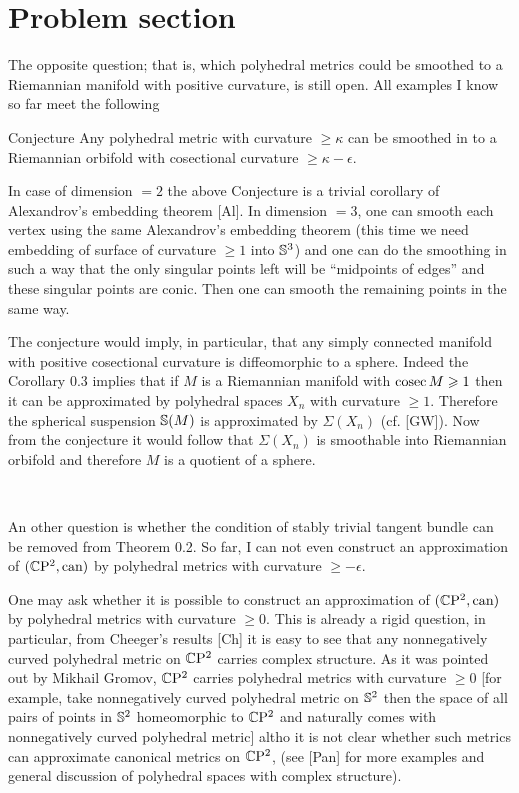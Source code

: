 \documentclass{article}
\begin{document}
\section{Problem section}


The opposite question;
that is, which polyhedral metrics
could be smoothed to a Riemannian manifold with positive curvature,
is still open. All examples I know so far meet the following


\begin{thm}{Conjecture} Any polyhedral metric with curvature $\ge \kappa$
can be smoothed in to a Riemannian orbifold with cosectional
curvature $\ge \kappa-\epsilon$.
\end{thm}

In case of dimension $=2$ the above Conjecture is a trivial
corollary of Alexandrov's embedding theorem [Al]. In dimension
$=3$, one can smooth each vertex using the same Alexandrov's
embedding theorem (this time we need embedding of surface of
curvature $\ge 1$ into $\mathbb{S}^3$) and one can do the smoothing in such
a way that the only singular points left will be ``midpoints of
edges'' and these singular points are conic. Then one can smooth
the remaining points in the same way.

The conjecture would imply, in particular,
that any simply connected
manifold with positive cosectional curvature is diffeomorphic
to a sphere.
Indeed the Corollary 0.3
implies that if $M$
is a Riemannian manifold with $\mathop{\rm cosec}\nolimits M\geqslant 1$ then it can be approximated by polyhedral spaces $X_n$
with curvature $\ge 1$.
 Therefore the spherical suspension $\mathbb{S}(M)$ is approximated by $\Sigma (X_n)$ (cf. [GW]).
Now from the conjecture it would follow that $\Sigma(X_n)$ is smoothable into Riemannian orbifold and therefore $M$ is a quotient of a sphere.

\

An other question is whether the condition of stably trivial tangent bundle
can be removed from Theorem 0.2.
 So far, I can not even construct an approximation of
$(\mathbb{C}\mathrm{P}^2,\text{can})$ by polyhedral metrics with curvature
$\ge -\epsilon$.

One may ask whether it is possible to construct an approximation
of $(\mathbb{C}\mathrm{P}^2,\text{can})$ by polyhedral metrics with curvature
$\ge 0$. This is already a rigid question, in particular, from
Cheeger's results [Ch] it is easy to see that any nonnegatively
curved polyhedral metric on $\mathbb{C}\mathrm{P}^2$ carries complex structure.
As it was pointed out by Mikhail Gromov,
$\mathbb{C}\mathrm{P}^2$ carries polyhedral
metrics with curvature $\ge 0$ 
[for example, take nonnegatively
curved polyhedral metric on $\mathbb{S}^2$ then the space of all pairs of
points in $\mathbb{S}^2$ homeomorphic to $\mathbb{C}\mathrm{P}^2$ and naturally comes with
nonnegatively curved polyhedral metric] altho it is not clear
whether such metrics can approximate canonical metrics on $\mathbb{C}\mathrm{P}^2$, (see [Pan] for more examples and general discussion of 
polyhedral spaces with complex structure). 
\end{document}

